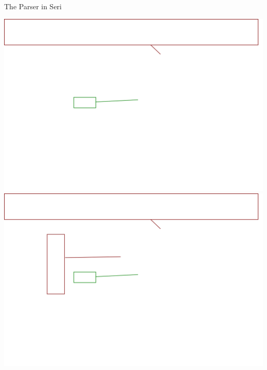 \documentclass{beamer}
\begin{document}
\begin{frame}{The Parser in Seri}
\begin{overprint}
 \includegraphics[width=\textwidth]{parser7}
 \includegraphics[width=\textwidth]{parser8}
\end{overprint}
\end{frame}
\end{document}
